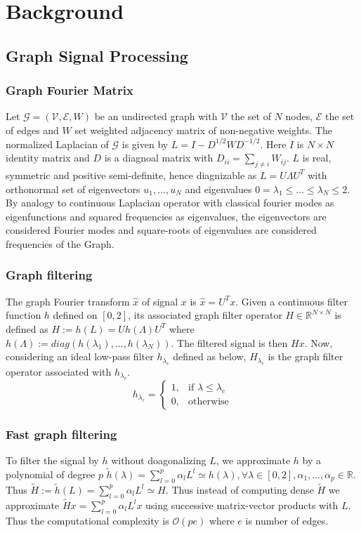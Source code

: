 \documentclass[10pt,a4paper,twoside]{report}
\theoremstyle{definition}
\begin{document}
	\chapter{Background}
	\section{Graph Signal Processing}
	\subsection*{Graph Fourier Matrix}
	Let $\mathcal{G} = (\mathcal{V},\mathcal{E}, W)$ be an undirected graph with $\mathcal{V}$ the set of $N$ nodes, $\mathcal{E}$ the set of edges and $W$ set weighted adjacency matrix of non-negative weights. The normalized Laplacian of $\mathcal{G}$ is given by $L=I-D^{1/2}WD^{-1/2}$. Here $I$ is $N\times N$ identity matrix and $D$ is a diagnoal matrix with $D_{ii} = \sum_{j\neq i}W_{ij}$. $L$ is real, symmetric and positive semi-definite, hence diagnizable as $L=U\Lambda U^T$ with orthonormal set of eigenvectors $u_1,\dots,u_N$ and eigenvalues $0=\lambda_1 \le \dots \le \lambda_N \le 2$. By analogy to continuous Laplacian operator with classical fourier modes as eigenfunctions and squared frequencies as eigenvalues, the eigenvectors are considered Fourier modes and square-roots of eigenvalues are considered frequencies of the Graph. 

	\subsection*{Graph filtering}
	The graph Fourier transform $\hat{x}$ of signal $x$ is $\hat{x} = U^Tx$. Given a continuous filter function $h$ defined on $[0,2]$, its associated graph filter operator $H\in \mathbb{R}^{N \times N}$ is defined as $H := h(L) = Uh(\Lambda)U^T$ where $h(\Lambda):=diag(h(\lambda_1), \dots, h(\lambda_N))$. The filtered signal is then $Hx$. Now, considering an ideal low-pass filter $h_{\lambda_c}$ defined as below, $H_{\lambda_c}$ is the graph filter operator associated with $h_{\lambda_c}$. 
	$$h_{\lambda_c} =  \begin{cases}1, &\text{if }\lambda \le \lambda_c \\ 0, &\text{otherwise}\end{cases}$$

	\subsection*{Fast graph filtering}
	To filter the signal by $h$ without doagonalizing $L$, we approximate $h$ by a polynomial of degree $p$ $\tilde{h}(\lambda) = \sum_{l=0}^{p}\alpha_{l}L^{l} \simeq h(\lambda), \forall \lambda \in [0,2], \alpha_1,\dots,\alpha_p \in \mathbb{R}$. Thus $\tilde{H} := \tilde{h}(L) = \sum_{l=0}^{p}\alpha_{l}L^{l} \simeq H$. Thus instead of computing dense $\tilde{H}$ we approximate $\tilde{H}x = \sum_{l=0}^{p}\alpha_{l}L^{l}x$ using successive matrix-vector products with $L$. Thus the computational complexity is $\mathcal{O}(pe)$ where $e$ is number of edges.
\end{document}
